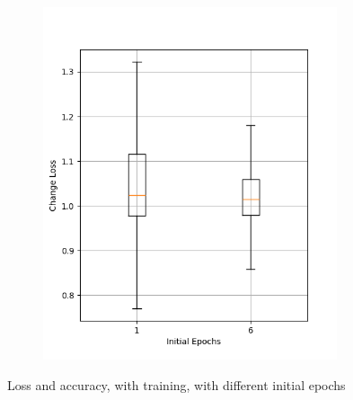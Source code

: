 \begin{figure}
\begin{subfigure}{0.5\textwidth}
        \includegraphics[width=0.95\textwidth]{plots/InitEpoch_Trained_loss.png}
    \end{subfigure}
    \caption{Loss and accuracy, with training, with different initial epochs}
    \label{fig:initial-epochs-training}
\end{figure}

